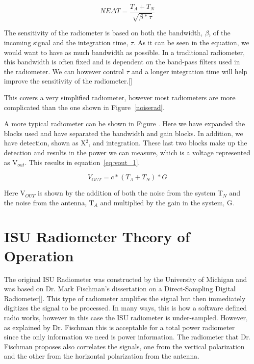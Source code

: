 \begin{equation}
NE\Delta T=\frac{T_{A}+T_{N}}{\sqrt{\beta * \tau}}
\end{equation}

The sensitivity of the radiometer is based on both the bandwidth, $\beta$, of the incoming signal and the integration time, $\tau$.  As it can be seen in the equation, we would want to have as much bandwidth as possible.  In a traditional radiometer, this bandwidth is often fixed and is dependent on the band-pass filters used in the radiometer.  We can however control $\tau$ and a longer integration time will help improve the sensitivity of the radiometer.[\cite{skou}]

This covers a very simplified radiometer, however most radiometers are more complicated than the one shown in Figure~\ref{noiserad}.


A more typical radiometer can be shown in Figure .  Here we have expanded the blocks used and have separated the bandwidth and gain blocks.  In addition, we have detection, shown as X$^2$, and integration.  These last two blocks make up the detection and results in the power we can measure, which is a voltage represented as V$_{out}$.  This results in equation~\ref{eq:vout_1}.

\begin{equation} \label{eq:vout_1}
V_{OUT}=c*(T_A+T_N)*G
\end{equation}

Here V$_{OUT}$ is shown by the addition of both the noise from the system T$_N$ and the noise from the antenna, T$_A$ and multiplied by the gain in the system, G.

\section{ISU Radiometer Theory of Operation}
The original ISU Radiometer was constructed by the University of Michigan and was based on Dr. Mark Fischman's dissertation on a Direct-Sampling Digital Radiometer[\cite{Fischman2001}].  This type of radiometer amplifies the signal but then immediately digitizes the signal to be processed.  In many ways, this is how a software defined radio works, however in this case the ISU radiometer is under-sampled.  However, as explained by Dr. Fischman this is acceptable for a total power radiometer since the only information we need is power information.  The radiometer that Dr. Fischman proposes also correlates the signals, one from the vertical polarization and the other from the horizontal polarization from the antenna.  


